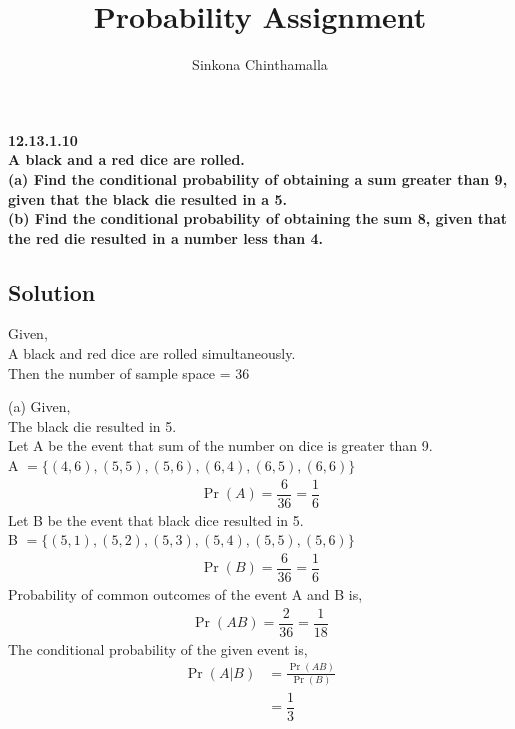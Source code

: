 \documentclass[10pt,twocolumn]{article}
\title{\textbf{Probability Assignment}}
\author{Sinkona Chinthamalla}
\providecommand{\pr}[1]{\ensuremath{\Pr\left(#1\right)}}
\begin{document}
\maketitle

\textbf {12.13.1.10 \\
A black and a red dice are rolled.\\
(a) Find the conditional probability of obtaining a sum greater than 9, given that the black die resulted in a 5.\vspace{0.1cm}\\
(b) Find the conditional probability of obtaining the sum 8, given that the red die resulted in a number less than 4.} 

\subsection*{Solution}
Given, \vspace{0.1cm} \\
A black and red dice are rolled simultaneously.\\
Then the number of sample space = 36 \\
\vspace{0.05cm}

(a) Given, \vspace{0.1cm} \\ 
The black die resulted in 5. \vspace{0.2cm}\\
Let A be the event that sum of the number on dice is greater than 9. \vspace{0.05cm}\\
A $= \{(4,6),(5,5),(5,6),(6,4),(6,5),(6,6)\} $ 
\begin{align}
\pr A =  \dfrac{6}{36} = \dfrac{1}{6}
\end{align}
\vspace{0.3cm}
Let B be the event that black dice resulted in 5. \\
B $ = \{( 5,1 ),( 5,2 ),( 5,3 ),( 5,4 ),( 5,5 ),( 5,6 )\} $ 
\begin{align}
\pr B =  \dfrac{6}{36} = \dfrac{1}{6}
\end{align}
Probability of common outcomes of the event A and B is, 
\begin{align}
\pr {AB} =  \dfrac{2}{36} = \dfrac{1}{18}
\end{align}
The conditional probability of the given event is,
\begin{align}
\pr { A|B } &= \frac{\pr {AB}}{\pr {B }} \\
&= \dfrac{1}{3}
\end{align}
\end{document}
